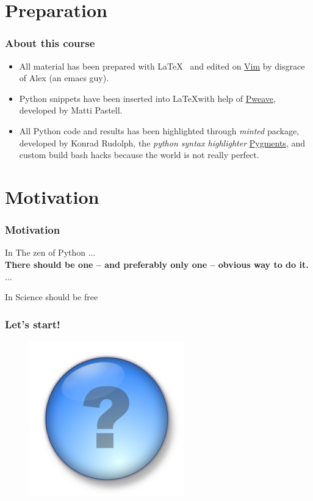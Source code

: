 \documentclass[9pt,colorlinks]{beamer}
\begin{document}
\section{Preparation} %
\label{sec:Preparation}

\begin{frame}[fragile]\frametitle{About this course}
\begin{block}{}


    \begin{itemize}
        \item All material has been prepared with \LaTeX~ and edited on \href{http://www.vim.org}{Vim} by disgrace of Alex (an emacs guy).
        \item Python snippets have been inserted into \LaTeX with help of \href{http://mpastell.com/pweave/}{Pweave}, developed by Matti Pastell. 
        \item All Python code and results has been highlighted through \emph{minted} package, developed by Konrad Rudolph, the \emph{python syntax highlighter} \href{http://pygments.org}{Pygments}, and custom build bash hacks because the world is not really perfect. 

    \end{itemize}
    \end{block}

\end{frame}

\section{Motivation}
\begin{frame}[fragile]\frametitle{Motivation}
\begin{block}{In The zen of Python}
    ...\\
    \textbf{There should be one -- and preferably only one -- obvious way to do it.}\\
    ...
\end{block}
\begin{block}{In }
Science should be free 
\end{block}

\end{frame}


\begin{frame}\frametitle{Let's start!}
\begin{figure}[!htb]
    \centering
    \includegraphics[width=0.6\textwidth]{figs/question}
\end{figure}
\end{frame}
\end{document}
